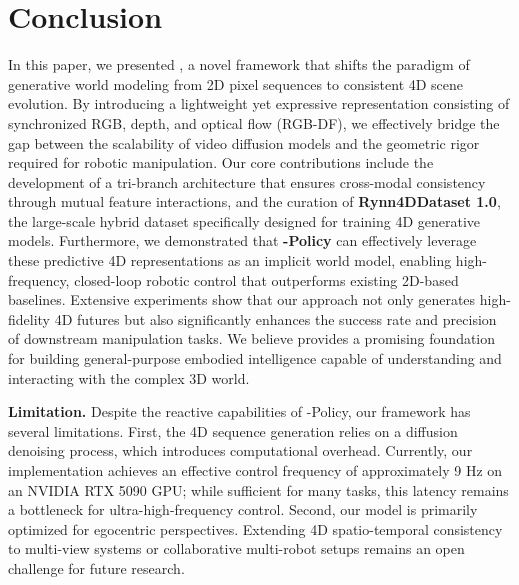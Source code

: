 \section{Conclusion}
In this paper, we presented \textbf{\our}, a novel framework that shifts the paradigm of generative world modeling from 2D pixel sequences to consistent 4D scene evolution. By introducing a lightweight yet expressive representation consisting of synchronized RGB, depth, and optical flow (RGB-DF), we effectively bridge the gap between the scalability of video diffusion models and the geometric rigor required for robotic manipulation. Our core contributions include the development of a tri-branch architecture that ensures cross-modal consistency through mutual feature interactions, and the curation of \textbf{Rynn4DDataset 1.0}, the large-scale hybrid dataset specifically designed for training 4D generative models. Furthermore, we demonstrated that \textbf{\our-Policy} can effectively leverage these predictive 4D representations as an implicit world model, enabling high-frequency, closed-loop robotic control that outperforms existing 2D-based baselines. Extensive experiments show that our approach not only generates high-fidelity 4D futures but also significantly enhances the success rate and precision of downstream manipulation tasks. We believe \our provides a promising foundation for building general-purpose embodied intelligence capable of understanding and interacting with the complex 3D world.

\noindent
\textbf{Limitation.} 
Despite the reactive capabilities of \our-Policy, our framework has several limitations. First, the 4D sequence generation relies on a diffusion denoising process, which introduces computational overhead. Currently, our implementation achieves an effective control frequency of approximately 9 Hz on an NVIDIA RTX 5090 GPU; while sufficient for many tasks, this latency remains a bottleneck for ultra-high-frequency control. Second, our model is primarily optimized for egocentric perspectives. Extending 4D spatio-temporal consistency to multi-view systems or collaborative multi-robot setups remains an open challenge for future research.
